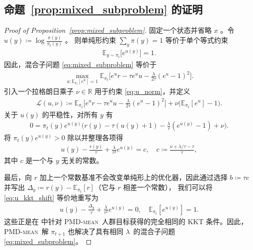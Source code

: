 \documentclass{article}
\theoremstyle{plain}
\theoremstyle{definition}
\theoremstyle{remark}
\newcommand{\E}{\mathbb{E}}
\begin{document}
\subsection{命题~\ref{prop:mixed_subproblem} 的证明}
\label{sec:proof_mixed}
\begin{proof}[Proof of Proposition~\ref{prop:mixed_subproblem}]
    固定一个状态并省略 $x$ 。令 $u(y)\coloneqq\log\frac{\pi(y)}{\pi_t(y)}$ 。  
则单纯形约束 $\sum_y\pi(y)=1$ 等价于单个等式约束
    \begin{align}
        \label{eq:u_norm}
        \E_{y\sim\pi_t}\big[e^{u(y)}\big]=1.
    \end{align}
    因此，混合子问题 \eqref{eq:mixed_subproblem} 等价于
    \begin{align*}
        \max_{u\colon\E_{\pi_t}[e^u]=1}\E_{\pi_t}\Big[e^u r - \tau e^u u - \frac{\lambda}{2\tau}(e^u-1)^2\Big].
    \end{align*}
    引入一个拉格朗日乘子 $\nu\in\mathbb{R}$ 用于约束 \eqref{eq:u_norm}，并定义
    \begin{align*}
        \mathcal{L}(u,\nu)
        \coloneqq\E_{\pi_t}\Big[e^u r - \tau e^u u - \frac{\lambda}{2\tau}(e^u-1)^2\Big] +\nu\big(\E_{\pi_t}[e^u]-1\big).
    \end{align*}
    关于 $u(y)$ 的平稳性，对所有 $y$ 有
    \begin{align*}
        0=\pi_t(y)e^{u(y)}\Big(r(y)-\tau(u(y)+1)-\frac{\lambda}{\tau}(e^{u(y)}-1)+\nu\Big).
    \end{align*}
    将 $\pi_t(y)e^{u(y)}>0$ 除以并整理各项得
    \begin{align}\label{eq:u_kkt_shift}
        u(y)-\frac{r(y)}{\tau}+\frac{\lambda}{\tau^2}e^{u(y)}=c,
        \quad
        c\coloneqq\frac{\nu+\lambda/\tau-\tau}{\tau},
    \end{align}
    其中 $c$ 是一个与 $y$ 无关的常数。

    最后，向 $r$ 加上一个常数基准不会改变单纯形上的优化器，因此通过选择 $b\coloneqq\tau c$ 并写出 $\Delta_y\coloneqq r(y)-\E_{\pi_t}[r]$（它与 $r$ 相差一个常数），  
我们可以将 \eqref{eq:u_kkt_shift} 等价地重写为
    \begin{align}\label{eq:u_kkt_final}
        u(y)-\frac{\Delta_y}{\tau}+\frac{\lambda}{\tau^2}e^{u(y)}=0, \quad \E_{\pi_t}[e^{u(y)}]=1.
    \end{align}
    这些正是在  中针对 \textsc{PMD-mean}\ 人群目标获得的完全相同的 KKT 条件。因此，\textsc{PMD-mean}\ 解 $\pi_{t+1}$ 也解决了具有相同 $\lambda$\ 的混合子问题 \eqref{eq:mixed_subproblem}。
\end{proof}
\end{document}
